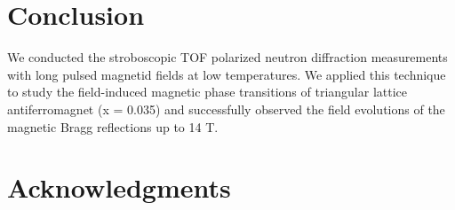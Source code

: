 \documentclass[%
 reprint,
superscriptaddress,
 amsmath,amssymb,
 aps,
floatfix,
]{revtex4-2}
\begin{document}
\section{Conclusion}
We conducted the stroboscopic TOF polarized neutron diffraction measurements with long pulsed magnetid fields at low temperatures.
We applied this technique to study the field-induced magnetic phase transitions of triangular lattice antiferromagnet  (x = 0.035) and successfully observed the field evolutions of the magnetic Bragg reflections up to 14 T.



\section{Acknowledgments}



\end{document}
